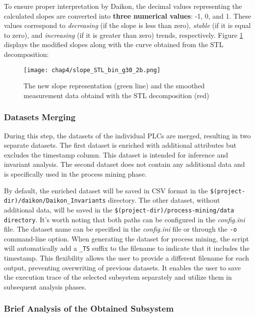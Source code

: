 \bigskip
To ensure proper interpretation by Daikon, the decimal values representing the calculated slopes are converted into \textbf{three numerical values}: -1, 0, and 1. These values correspond to \textit{decreasing} (if the slope is less than zero), \textit{stable} (if it is equal to zero), and \textit{increasing} (if it is greater than zero) trends, respectively. Figure \ref{fig:4_slope_daikon} displays the modified slopes along with the curve obtained from the STL decomposition:

\begin{figure}[ht]
	\centering
	\texttt{[image: chap4/slope\_STL\_bin\_g30\_2b.png]}
	\caption{The new slope representation (green line) and the smoothed measurement data obtaind with the STL decomposition (red)}
	\label{fig:4_slope_daikon}
\end{figure}

\subsubsection{Datasets Merging}
\label{subsubsec:4_dataset_merging}
During this step, the datasets of the individual PLCs are merged, resulting in two separate datasets. The first dataset is enriched with additional attributes but excludes the timestamp column. This dataset is intended for inference and invariant analysis. The second dataset does not contain any additional data and is specifically used in the process mining phase.

\bigskip
By default, the enriched dataset will be saved in CSV format in the \texttt{\$(project-dir)/daikon/Daikon\_Invariants} directory. The other dataset, without additional data, will be saved in the \texttt{\$(project-dir)/process-mining/data directory}. It's worth noting that both paths can be configured in the \textit{config.ini} file. The dataset name can be specified in the \textit{config.ini} file or through the \texttt{-o} command-line option. When generating the dataset for process mining, the script will automatically add a \texttt{\_TS} suffix to the filename to indicate that it includes the timestamp. This flexibility allows the user to provide a different filename for each output, preventing overwriting of previous datasets. It enables the user to save the execution trace of the selected subsystem separately and utilize them in subsequent analysis phases.

\subsubsection{Brief Analysis of the Obtained Subsystem}
\label{subsubsec:4_brief_analysis}

